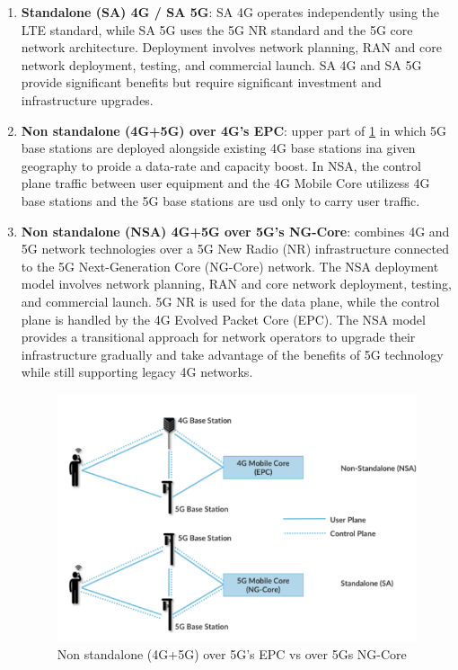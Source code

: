 \documentclass[10pt,a4paper]{report}
\theoremstyle{definition}
\begin{document}
\begin{enumerate}
	\item  \textbf{Standalone (SA) 4G / SA 5G}: SA 4G operates independently using the LTE standard, while SA 5G uses the 5G NR standard and the 5G core network architecture. Deployment involves network planning, RAN and core network deployment, testing, and commercial launch. SA 4G and SA 5G provide significant benefits but require significant investment and infrastructure upgrades.
	\item 
	\textbf{Non standalone (4G+5G) over 4G's EPC}: upper part of \ref{deployment-options} in which 5G base stations are deployed alongside existing 4G base stations ina given geography to proide a data-rate and capacity boost. In NSA, the control plane traffic between user equipment and the 4G Mobile Core utilizess 4G base stations and the 5G base stations are usd only to carry user traffic.
	\item 
	\textbf{Non standalone (NSA) 4G+5G over 5G's NG-Core}: combines 4G and 5G network technologies over a 5G New Radio (NR) infrastructure connected to the 5G Next-Generation Core (NG-Core) network. The NSA deployment model involves network planning, RAN and core network deployment, testing, and commercial launch. 5G NR is used for the data plane, while the control plane is handled by the 4G Evolved Packet Core (EPC). The NSA model provides a transitional approach for network operators to upgrade their infrastructure gradually and take advantage of the benefits of 5G technology while still supporting legacy 4G networks.
	\begin{figure}[h]
		\centering\includegraphics[scale=0.50]{images/Pasted image 20230308172804.png}
		\caption{Non standalone (4G+5G) over 5G's EPC vs over 5Gs NG-Core}
	\label{deployment-options}	
\end{figure}
	
\end{enumerate}
\end{document}
